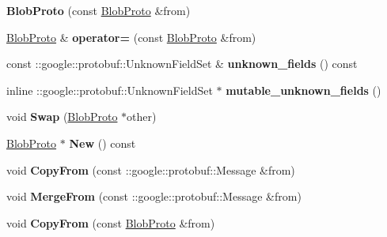\begin{DoxyCompactItemize}
{\bfseries Blob\+Proto} (const \mbox{\hyperlink{classcaffe_1_1_blob_proto}{Blob\+Proto}} \&from)
\item 
\mbox{\label{classcaffe_1_1_blob_proto_ae36050dd6bb5ad0931ab8fe6b0396c03}} 
\mbox{\hyperlink{classcaffe_1_1_blob_proto}{Blob\+Proto}} \& {\bfseries operator=} (const \mbox{\hyperlink{classcaffe_1_1_blob_proto}{Blob\+Proto}} \&from)
\item 
\mbox{\label{classcaffe_1_1_blob_proto_a7d44c2677044cf9e9c5b5048f068e701}} 
const \+::google\+::protobuf\+::\+Unknown\+Field\+Set \& {\bfseries unknown\+\_\+fields} () const
\item 
\mbox{\label{classcaffe_1_1_blob_proto_acaa3319fba3550fff66cdd96225fe015}} 
inline \+::google\+::protobuf\+::\+Unknown\+Field\+Set $\ast$ {\bfseries mutable\+\_\+unknown\+\_\+fields} ()
\item 
\mbox{\label{classcaffe_1_1_blob_proto_ab2bcb5519fcbf4194235e8176b0f9c03}} 
void {\bfseries Swap} (\mbox{\hyperlink{classcaffe_1_1_blob_proto}{Blob\+Proto}} $\ast$other)
\item 
\mbox{\label{classcaffe_1_1_blob_proto_ac8fe980f5398b5b225a8a9fa8aa97df3}} 
\mbox{\hyperlink{classcaffe_1_1_blob_proto}{Blob\+Proto}} $\ast$ {\bfseries New} () const
\item 
\mbox{\label{classcaffe_1_1_blob_proto_a3d25a86143488facc370f070fe902364}} 
void {\bfseries Copy\+From} (const \+::google\+::protobuf\+::\+Message \&from)
\item 
\mbox{\label{classcaffe_1_1_blob_proto_a1760a0fca849a41e1b235dc015591160}} 
void {\bfseries Merge\+From} (const \+::google\+::protobuf\+::\+Message \&from)
\item 
\mbox{\label{classcaffe_1_1_blob_proto_a400e1a5db5268bffe51a48abb46390f0}} 
void {\bfseries Copy\+From} (const \mbox{\hyperlink{classcaffe_1_1_blob_proto}{Blob\+Proto}} \&from)
\item 
\mbox{\label{classcaffe_1_1_blob_proto_a2036cc566f48e8f194a6a1fc1f47a3f5}} 

\end{DoxyCompactItemize}
